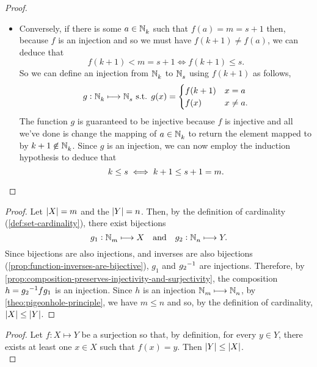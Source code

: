 \documentclass[../MathsNotesBase.tex]{subfiles}
\begin{document}
{\begin{proof}
\begin{itemize}
				\bigskip
				\item Conversely, if there is some ${ a \in \mathbb{N}^{}_k }$ such that ${ f(a) = m = s+1 }$ then, because $f$ is an injection and so we must have ${ f(k+1) \neq f(a) }$, we can deduce that
				\[ f(k+1) < m = s+1 \iff f(k+1) \leq s. \]
				So we can define an injection from $\mathbb{N}^{}_k$ to $\mathbb{N}^{}_s$ using $f(k+1)$ as follows,
				\[	g: \mathbb{N}^{}_k \longmapsto \mathbb{N}^{}_s \text{ s.t. } g(x) = 	\begin{cases}
					f(k+1) & x = a \\
					f(x) & x \neq a.	
				\end{cases}
				\]
				The function $g$ is guaranteed to be injective because $f$ is injective and all we've done is change the mapping of ${ a \in \mathbb{N}^{}_k }$ to return the element mapped to by ${ k+1 \centernot\in \N{}_k }$. Since $g$ is an injection, we can now employ the induction hypothesis to deduce that
				\[ k \leq s \iff k + 1 \leq s + 1 = m. \qedhere \]
			\end{itemize}
		\end{proof}
		
		
		\bigskip
		\begin{proof}
			Let ${ \left\lvert X\right\rvert = m }$ and the ${ \left\lvert Y\right\rvert = n }$. Then, by the definition of cardinality (\ref{def:set-cardinality}), there exist bijections
			\[ g_1: \mathbb{N}^{}_m \longmapsto X \hspace{10pt}\text{and}\hspace{10pt} g_2: \mathbb{N}^{}_n \longmapsto Y. \]
			Since bijections are also injections, and inverses are also bijections (\autoref{prop:function-inverses-are-bijective}), $g_1$ and ${g_2}^{-1}$ are injections. Therefore, by \autoref{prop:composition-preserves-injectivity-and-surjectivity}, the composition ${ h = {g_2}^{-1} f g_1 }$ is an injection. Since $h$ is an injection ${ \mathbb{N}^{}_m \longmapsto \mathbb{N}^{}_n }$, by \autoref{theo:pigeonhole-principle}, we have ${ m \leq n }$ and so, by the definition of cardinality, ${ \left\lvert X\right\rvert \leq \left\lvert Y\right\rvert }$.
		\end{proof}
		
		\bigskip
		\begin{proof}
			Let ${ f: X \longmapsto Y }$ be a surjection so that, by definition, for every ${ y \in Y }$, there exists at least one ${ x \in X }$ such that ${ f(x) = y }$. Then ${ \left\lvert Y\right\rvert \leq \left\lvert X\right\rvert }$.\\
			

\end{proof}}
\end{document}
